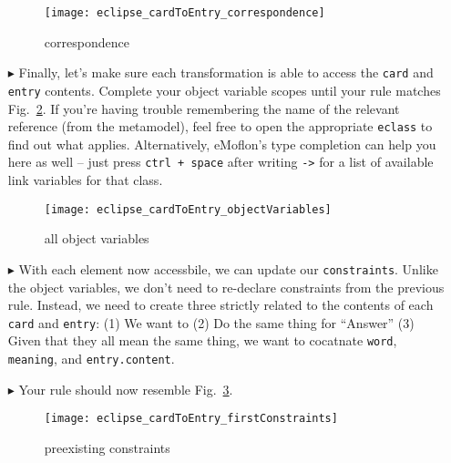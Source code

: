 \begin{itemize}
\begin{figure}[htbp]
\begin{center}
  \texttt{[image: eclipse\_cardToEntry\_correspondence]}
  \caption{correspondence}
  \label{fig:c2etargetCorresp}
\end{center}
\end{figure}

\item[$\blacktriangleright$] Finally, let's make sure each transformation is able to access the \texttt{card} and \texttt{entry} contents. Complete your object
variable scopes until your rule matches Fig.~\ref{fig:c2eAllReferences}. If you're having trouble remembering the name of the relevant reference (from the
metamodel), feel free to open the appropriate \texttt{eclass} to find out what applies. Alternatively, eMoflon's type completion can help you here as well --
just press \texttt{ctrl + space} after writing \texttt{->} for a list of available link variables for that class.

\begin{figure}[htbp]
\begin{center}
  \texttt{[image: eclipse\_cardToEntry\_objectVariables]}
  \caption{all object variables}
  \label{fig:c2eAllReferences}
\end{center}
\end{figure}

\item[$\blacktriangleright$] With each element now accessbile, we can update our \texttt{constraints}. Unlike the object variables, we don't need to re-declare
constraints from the previous rule. Instead, we need to create three strictly related to the contents of each \texttt{card} and \texttt{entry}:
(1) We want to 
(2) Do the same thing for ``Answer''
(3) Given that they all mean the same thing, we want to cocatnate \texttt{word}, \texttt{meaning}, and \texttt{entry.content}.

\item[$\blacktriangleright$] Your rule should now resemble Fig.~\ref{fig:contentConstraints}.

\begin{figure}[htbp]
\begin{center}
  \texttt{[image: eclipse\_cardToEntry\_firstConstraints]}
  \caption{preexisting constraints}
  \label{fig:contentConstraints}
\end{center}
\end{figure}


\end{itemize}
